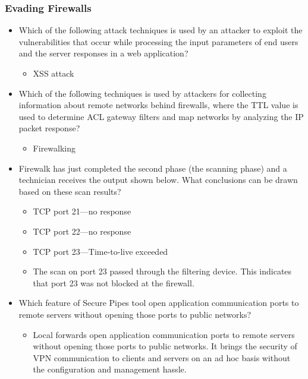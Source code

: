 \subsubsection{Evading Firewalls}
\begin{itemize}
    \item Which of the following attack techniques is used by an attacker to exploit the vulnerabilities that occur while processing the input parameters of end users and the server responses in a web application?
    \begin{itemize}
        \item XSS attack
    \end{itemize}
    \item Which of the following techniques is used by attackers for collecting information about remote networks behind firewalls, where the TTL value is used to determine ACL gateway filters and map networks by analyzing the IP packet response?
    \begin{itemize}
        \item Firewalking
    \end{itemize}
    \item Firewalk has just completed the second phase (the scanning phase) and a technician receives the output shown below.
    What conclusions can be drawn based on these scan results?
    \begin{itemize}
        \item TCP port 21—no response
        \item TCP port 22—no response
        \item TCP port 23—Time-to-live exceeded
    \end{itemize}
    \begin{itemize}
        \item The scan on port 23 passed through the filtering device. This indicates that port 23 was not blocked at the firewall.
    \end{itemize}
    \item Which feature of Secure Pipes tool open application communication ports to remote servers without opening those ports to public networks?
    \begin{itemize}
        \item Local forwards open application communication ports to remote servers without opening those ports to public networks. It brings the security of VPN communication to clients and servers on an ad hoc basis without the configuration and management hassle.
    \end{itemize}
\end{itemize}
